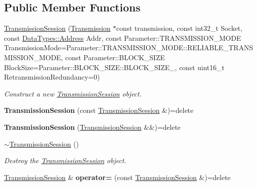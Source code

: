 \subsection*{Public Member Functions}
\begin{DoxyCompactItemize}
\item 
\hyperlink{class_network_coding_1_1_transmission_session_a4ab773a704ec3740cbf222cad7e45262}{Transmission\+Session} (\hyperlink{class_network_coding_1_1_transmission}{Transmission} $\ast$const transmission, const int32\+\_\+t Socket, const \hyperlink{class_network_coding_1_1_data_types_1_1_address}{Data\+Types\+::\+Address} Addr, const Parameter\+::\+T\+R\+A\+N\+S\+M\+I\+S\+S\+I\+O\+N\+\_\+\+M\+O\+DE Transmission\+Mode=Parameter\+::\+T\+R\+A\+N\+S\+M\+I\+S\+S\+I\+O\+N\+\_\+\+M\+O\+D\+E\+::\+R\+E\+L\+I\+A\+B\+L\+E\+\_\+\+T\+R\+A\+N\+S\+M\+I\+S\+S\+I\+O\+N\+\_\+\+M\+O\+DE, const Parameter\+::\+B\+L\+O\+C\+K\+\_\+\+S\+I\+ZE Block\+Size=Parameter\+::\+B\+L\+O\+C\+K\+\_\+\+S\+I\+Z\+E\+::\+B\+L\+O\+C\+K\+\_\+\+S\+I\+Z\+E\+\_, const uint16\+\_\+t Retransmission\+Redundancy=0)
\begin{DoxyCompactList}\small\item\em Construct a new \hyperlink{class_network_coding_1_1_transmission_session}{Transmission\+Session} object. \end{DoxyCompactList}\item 
{\bfseries Transmission\+Session} (const \hyperlink{class_network_coding_1_1_transmission_session}{Transmission\+Session} \&)=delete\hypertarget{class_network_coding_1_1_transmission_session_ad6ea42437c5b6233d5785fe6c2126c1b}{}\label{class_network_coding_1_1_transmission_session_ad6ea42437c5b6233d5785fe6c2126c1b}

\item 
{\bfseries Transmission\+Session} (\hyperlink{class_network_coding_1_1_transmission_session}{Transmission\+Session} \&\&)=delete\hypertarget{class_network_coding_1_1_transmission_session_a455fee7d9cb4c90bacb304ad37373548}{}\label{class_network_coding_1_1_transmission_session_a455fee7d9cb4c90bacb304ad37373548}

\item 
\hyperlink{class_network_coding_1_1_transmission_session_a56c1ac128002a5e5e554511dba2d6a1d}{$\sim$\+Transmission\+Session} ()
\begin{DoxyCompactList}\small\item\em Destroy the \hyperlink{class_network_coding_1_1_transmission_session}{Transmission\+Session} object. \end{DoxyCompactList}\item 
\hyperlink{class_network_coding_1_1_transmission_session}{Transmission\+Session} \& {\bfseries operator=} (const \hyperlink{class_network_coding_1_1_transmission_session}{Transmission\+Session} \&)=delete\hypertarget{class_network_coding_1_1_transmission_session_a9005d3d1bfb5e5ef8b0a3c01f1426406}{}\label{class_network_coding_1_1_transmission_session_a9005d3d1bfb5e5ef8b0a3c01f1426406}


\end{DoxyCompactItemize}
